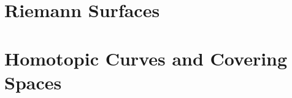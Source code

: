 \documentclass[a4paper, 8pt, notitlepage]{extreport}
\begin{document}
    

    \chapter{Riemann Surfaces}
    
    
    

    \chapter{Homotopic Curves and Covering Spaces}
    
    
    
    

    \printbibliography
\end{document}
